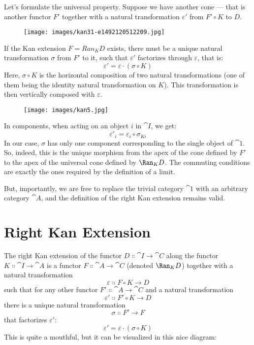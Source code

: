 Let's formulate the universal property. Suppose we have another cone ---
that is another functor $F'$ together with a natural
transformation $\varepsilon'$ from $F' \circ K$ to
$D$.

\begin{figure}[H]
  \centering
  \texttt{[image: images/kan31-e1492120512209.jpg]}
\end{figure}

\noindent
If the Kan extension $F = Ran_{K}D$ exists, there must be a unique
natural transformation $\sigma$ from $F'$ to it, such
that $\varepsilon'$ factorizes through $\varepsilon$, that is:
\[\varepsilon' = \varepsilon \cdot (\sigma \circ K)\]
Here, $\sigma \circ K$ is the horizontal composition of two natural
transformations (one of them being the identity natural transformation
on $K$). This transformation is then vertically composed with
$\varepsilon$.

\begin{figure}[H]
  \centering
  \texttt{[image: images/kan5.jpg]}
\end{figure}

\noindent
In components, when acting on an object $i$ in $\cat{I}$, we get:
\[\varepsilon'_i = \varepsilon_i \circ \sigma_{K i}\]
In our case, $\sigma$ has only one component corresponding to the
single object of $\cat{1}$. So, indeed, this is the unique morphism
from the apex of the cone defined by $F'$ to the apex of
the universal cone defined by $\Ran_{K}D$. The commuting conditions
are exactly the ones required by the definition of a limit.

But, importantly, we are free to replace the trivial category $\cat{1}$
with an arbitrary category $\cat{A}$, and the definition of the right Kan
extension remains valid.

\section{Right Kan Extension}

The right Kan extension of the functor $D \Colon \cat{I} \to \cat{C}$
along the functor $K \Colon \cat{I} \to \cat{A}$ is a functor
$F \Colon \cat{A} \to \cat{C}$ (denoted $\Ran_{K}D$) together with a
natural transformation
\[\varepsilon \Colon F \circ K \to D\]
such that for any other functor $F' \Colon \cat{A} \to \cat{C}$ and
a natural transformation
\[\varepsilon' \Colon F' \circ K \to D\]
there is a unique natural transformation
\[\sigma \Colon F' \to F\]
that factorizes $\varepsilon'$:
\[\varepsilon' = \varepsilon \cdot (\sigma \circ K)\]
This is quite a mouthful, but it can be visualized in this nice diagram:

